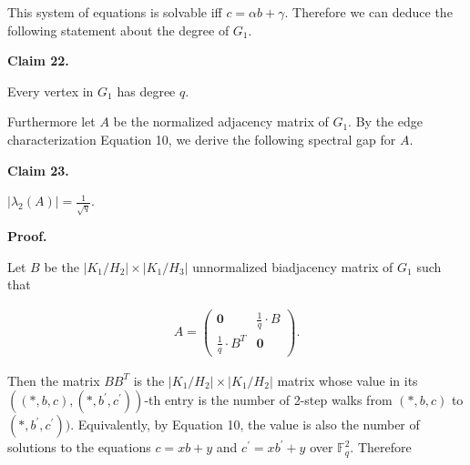 \documentclass[10pt,a4paper]{article}
\begin{document}
This system of equations is solvable iff $c=\alpha b+\gamma$. Therefore we can deduce the following statement about the degree of $G_{1}$.\par





\par\medskip\noindent\textbf{
Claim 22. 
}\par



Every vertex in $G_{1}$ has degree $q$.\par






Furthermore let $A$ be the normalized adjacency matrix of $G_{1}$. By the edge characterization Equation 10, we derive the following spectral gap for $A$.\par





\par\medskip\noindent\textbf{
Claim 23. 
}\par



$|\lambda_{2}(A)|=\frac{1}{\sqrt{q}}$.\par






\par\medskip\noindent\textbf{
\textbf{Proof}.}\par




Let $B$ be the $|K_{1}/H_{2}|\times|K_{1}/H_{3}|$ unnormalized biadjacency matrix of $G_{1}$ such that\par


\[\begin{gathered}
A=\begin{pmatrix}\mathbf{0}&\frac{1}{q}\cdot B\\
\frac{1}{q}\cdot B^{T}&\mathbf{0}\end{pmatrix}.
\end{gathered}\]




Then the matrix $BB^{T}$ is the $|K_{1}/H_{2}|\times|K_{1}/H_{2}|$ matrix whose value in its $((*,b,c),(*,b^{\prime},c^{\prime}))$-th entry is the number of 2-step walks from $(*,b,c)$ to $(*,b^{\prime},c^{\prime}))$. Equivalently, by Equation 10, the value is also the number of solutions to the equations $c=xb+y$ and $c^{\prime}=xb^{\prime}+y$ over $\mathbb{F}^{2}_{q}$. Therefore\par
\end{document}
